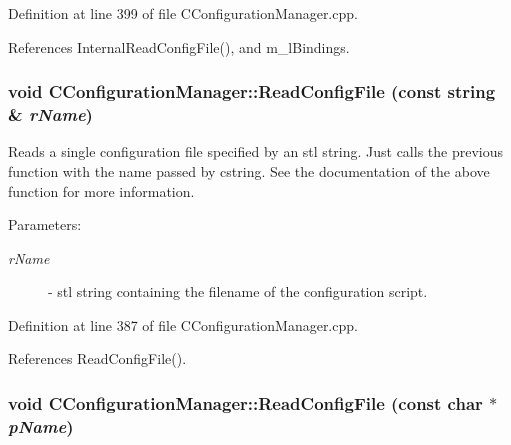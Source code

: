 Definition at line 399 of file CConfiguration\-Manager.cpp.

References Internal\-Read\-Config\-File(), and m\_\-l\-Bindings.
\subsubsection{\setlength{\rightskip}{0pt plus 5cm}void CConfiguration\-Manager::Read\-Config\-File (const string \& {\em r\-Name})}\label{classCConfigurationManager_a12}


Reads a single configuration file specified by an stl string. Just calls the previous function with the name passed by cstring. See the documentation of the above function for more information. \begin{Desc}
\item[Parameters: ]\par
\begin{description}
\item[{\em 
r\-Name}]- stl string containing the filename of the configuration script. \end{description}
\end{Desc}


Definition at line 387 of file CConfiguration\-Manager.cpp.

References Read\-Config\-File().
\subsubsection{\setlength{\rightskip}{0pt plus 5cm}void CConfiguration\-Manager::Read\-Config\-File (const char $\ast$ {\em p\-Name})}\label{classCConfigurationManager_a11}


